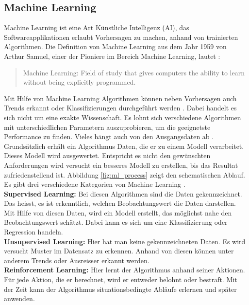 \subsection{Machine Learning}
Machine Learning ist eine Art Künstliche Intelligenz (AI), das Softwareapplikationen erlaubt Vorhersagen zu machen, anhand von trainierten Algorithmen.
Die Definition von Machine Learning aus dem Jahr 1959 von Arthur Samuel, einer der Pioniere im Bereich Machine Learning, lautet \cite{what_is_ml}: 
  \begin{quote}
    Machine Learning: Field of study that gives computers the ability to learn without being explicitly programmed.
  \end{quote}
Mit Hilfe von Machine Learning Algorithmen können neben Vorhersagen auch Trends erkannt oder Klassifizierungen durchgeführt werden \cite{ml_book}.
Dabei handelt es sich nicht um eine exakte Wissenschaft. Es lohnt sich verschiedene Algorithmen mit unterschiedlichen Parametern auszuprobieren, um die geeignetste Performance zu finden. Vieles hängt auch von den Ausgangsdaten ab \cite{ml_azure}.\\
%
Grundsätzlich erhält ein Algorithmus Daten, die er zu einem Modell verarbeitet. Dieses Modell wird ausgewertet. Entspricht es nicht den gewünschten Anforderungen wird versucht ein besseres Modell zu erstellen, bis das Resultat zufriedenstellend ist. Abbildung \ref{fig:ml_process} zeigt den schematischen Ablauf.\\

\newline
%
Es gibt drei verschiedene Kategorien von Machine Learning \cite{super_unsuper}.\\
\textbf{Supervised Learning:}	Bei diesen Algorithmen sind die Daten gekennzeichnet. Das heisst, es ist erkenntlich, welchen Beobachtungswert die Daten darstellen. Mit Hilfe von diesen Daten, wird ein Modell erstellt, das möglichst nahe den Beobachtungswert schätzt. Dabei kann es sich um eine Klassifizierung oder Regression handeln.\\[2ex]
%
\textbf{Unsupervised Learning:} Hier hat man keine gekennzeichneten Daten. Es wird versucht Muster im Datensatz zu erkennen. Anhand von diesen können unter anderem Trends oder Ausreisser erkannt werden.\\[2ex]
%
\textbf{Reinforcement Learning:} Hier lernt der Algorithmus anhand seiner Aktionen. Für jede Aktion, die er berechnet, wird er entweder belohnt oder bestraft. Mit der Zeit kann der Algorithmus situationsbedingte Abläufe erlernen und später anwenden.\\[2ex]
